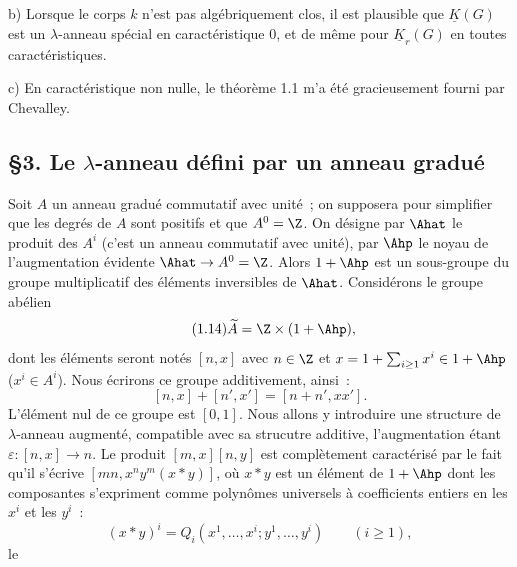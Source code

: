 b)
Lorsque le corps $k$ n'est pas algébriquement clos, il est plausible que $\underline{K}(G)$ est un $\lambda$-anneau spécial en caractéristique $0$, et de même pour $\underline{K}_r(G)$ en toutes caractéristiques.

c) En caractéristique non nulle, le théorème 1.1 m'a été gracieusement fourni par Chevalley.

\subsection*{\S 3. Le $\lambda$-anneau défini par un anneau gradué}

Soit $A$ un anneau gradué commutatif avec unité~; on supposera pour simplifier que les degrés de $A$ sont positifs et que $A^0=\Z$. On désigne par $\Ahat$ le produit des $A^i$ (c'est un anneau commutatif avec unité), par $\Ahp$ le noyau de l'augmentation évidente $\Ahat\to A^0=\Z$. Alors $1+\Ahp$ est un sous-groupe du groupe multiplicatif des éléments inversibles de $\Ahat$. Considérons le groupe abélien
\begin{equation}\tag{1.14}
\widetilde A=\Z\times(1+\Ahp),
\end{equation}
dont les éléments seront notés $[n,x]$ avec $n\in\Z$ et $x=1+\sum_{i\geq 1}x^i\in1+\Ahp$ ($x^i\in A^i$). Nous écrirons ce groupe additivement, ainsi~:
\begin{equation}\tag{1.15}
[n,x]+[n',x']=[n+n',xx'].
\end{equation}
L'élément nul de ce groupe est $[0,1]$. Nous allons y introduire une structure de $\lambda$-anneau augmenté, compatible avec sa strucutre additive, l'augmentation étant $\varepsilon:[n,x]\longrightarrow n$. Le produit $[m,x][n,y]$ est complètement caractérisé par le fait qu'il s'écrive $[mn,x^n y^m(x*y)]$, où $x*y$ est un élément de $1+\Ahp$ dont les composantes s'expriment comme polynômes universels à coefficients entiers en les $x^i$ et les $y^i$~:
\begin{equation}\tag{1.16}
(x*y)^i=Q_i(x^1,\ldots,x^i;y^1,\ldots,y^i)\qquad (i\geq1),
\end{equation}
le
